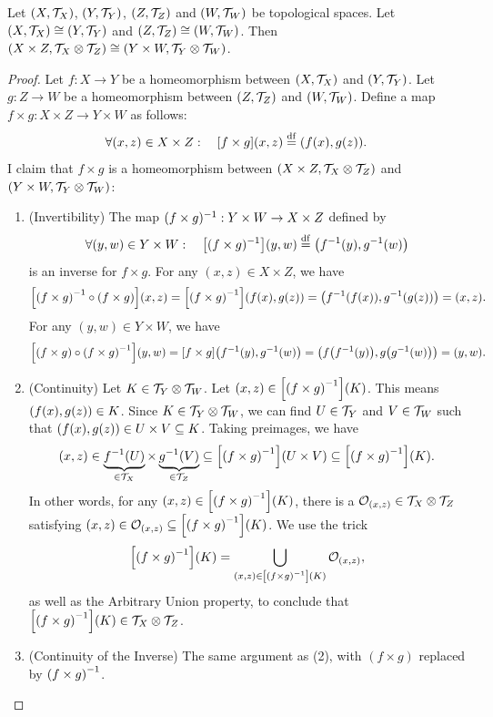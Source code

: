 \documentclass[11pt,reqno]{amsart}
\begin{document}
\begin{Thm}\label{thm:prod-homeo-inv}
Let $(X,\mathcal{T}_X)$, $(Y,\mathcal{T}_Y)$, $(Z,\mathcal{T}_Z)$ and $(W,\mathcal{T}_W)$ be topological spaces.
Let $(X,\mathcal{T}_X)\cong(Y,\mathcal{T}_Y)$ and $(Z,\mathcal{T}_Z)\cong(W,\mathcal{T}_W)$.
Then $(X\times Z,\mathcal{T}_X\otimes\mathcal{T}_Z)\cong (Y\times W,\mathcal{T}_Y\otimes\mathcal{T}_W)$.
\end{Thm}
\begin{proof}
Let $f:X\to Y$ be a homeomorphism between $(X,\mathcal{T}_X)$ and $(Y,\mathcal{T}_Y)$.
Let $g:Z\to W$ be a homeomorphism between $(Z,\mathcal{T}_Z)$ and $(W,\mathcal{T}_W)$.
Define a map $f\times g:X\times Z\to Y\times W$ as follows:
\[
\forall (x,z)\in X\times Z:\quad
\FUNC{f\times g}{x,z}\df(f(x),g(z)).
\]
I claim that $f\times g$ is a homeomorphism between
$(X\times Z,\mathcal{T}_X\otimes\mathcal{T}_Z)$ and $(Y\times W,\mathcal{T}_Y\otimes\mathcal{T}_W)$:
\begin{enumerate}
\item(Invertibility)
The map $(f\times g)^{-1}:Y\times W\to X\times Z$ defined by
\[\forall (y,w)\in Y\times W:\quad
\FUNC{(f\times g)\inv}{y,w}\df\Br{f\inv(y),g\inv(w)}
\]
is an inverse for $f\times g$.
For any $(x,z)\in X\times Z$, we have
\[
\FUNC{\Br{f\times g}\inv\circ\Br{f\times g}}{x,z}
=\FUNC{\Br{f\times g}\inv}{f(x),g(z)}
=\Br{f\inv(f(x)),g\inv(g(z))}
=\Br{x,z}.
\]
For any $(y,w)\in Y\times W$, we have
\[
\FUNC{(f\times g)\circ\Br{f\times g}\inv}{y,w}
=\FUNC{f\times g}{f\inv(y),g\inv(w)}
=\Br{f\Br{f\inv(y)},g\Br{g\inv(w)}}
=\Br{y,w}.
\]

\item(Continuity)
Let $K\in\mathcal{T}_Y\otimes\mathcal{T}_W$.
Let $(x,z)\in\FUNC{\Br{f\times g}\inv}{K}$.
This means $\Br{f(x),g(z)}\in K$.
Since $K\in\mathcal{T}_Y\otimes\mathcal{T}_W$, we can find
$U\in\mathcal{T}_Y$ and $V\in\mathcal{T}_W$ such that
$\Br{f(x),g(z)}\in U\times V\subseteq K$.
Taking preimages, we have
\[
(x,z)\in
\underbrace{f\inv(U)}_{\in\T_X}\times
\underbrace{g\inv(V)}_{\in\T_Z}
\subseteq\FUNC{\Br{f\times g}\inv}{U\times V}
\subseteq\FUNC{\Br{f\times g}\inv}{K}.\]
In other words, for any $(x,z)\in\FUNC{\Br{f\times g}\inv}{K}$,
there is a $\mathcal O_{(x,z)}\in\mathcal{T}_X\otimes\mathcal{T}_Z$ satisfying
$(x,z)\in\mathcal O_{(x,z)}\subseteq\FUNC{\Br{f\times g}\inv}{K}$.
We use the trick
\[\FUNC{\Br{f\times g}\inv}{K}
=\bigcup_{(x,z)\in\FUNC{\Br{f\times g}\inv}{K}}\mathcal O_{(x,z)},
\]
as well as the Arbitrary Union property, to conclude that
$\FUNC{\Br{f\times g}\inv}{K}\in\T_X\otimes\T_Z$.

\item(Continuity of the Inverse)
The same argument as (2), with $(f\times g)$ replaced by $\Br{f\times g}\inv$.
\end{enumerate}
\end{proof}
\end{document}
